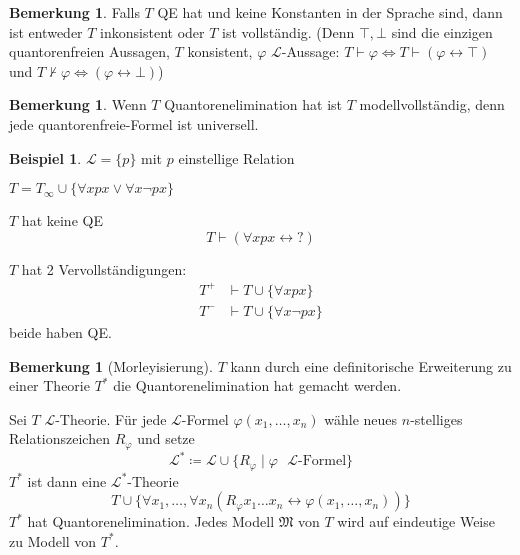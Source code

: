 \documentclass[12pt,parskip=full]{scrartcl}
\theoremstyle{definition}
\newtheorem{example}[theorem]{Beispiel}
\newtheorem{remark}[theorem]{Bemerkung}
\begin{document}
	\begin{remark}
		Falls $T$ QE hat und keine Konstanten in der Sprache sind, dann ist entweder $T$ inkonsistent oder $T$ ist vollständig. (Denn $\top, \bot$ sind die einzigen quantorenfreien Aussagen, $T$ konsistent, $\varphi$ $\mathcal{L}$-Aussage: $T \vdash \varphi \Leftrightarrow T \vdash (\varphi \leftrightarrow \top)$ und $T \not\vdash \varphi \Leftrightarrow (\varphi \leftrightarrow \bot)$)
	\end{remark}

	\begin{remark}
		Wenn $T$ Quantorenelimination hat ist $T$ modellvollständig, denn jede quantorenfreie-Formel ist universell.
	\end{remark}

	\begin{example}
		$\mathcal{L} = \{ p \}$ mit $p$ einstellige Relation
		
		$T = T_\infty \cup \{ \forall x p x \lor \forall x \lnot p x \}$
		
		$T$ hat keine QE
		\begin{equation*}
			T \vdash (\forall x px \leftrightarrow ?)
		\end{equation*}
		
		$T$ hat 2 Vervollständigungen:
		\begin{align*}
			T^+ &\vdash T \cup \{ \forall x p x \} \\
			T^- &\vdash T \cup \{ \forall x \lnot p x \}
		\end{align*}
		beide haben QE.
	\end{example}

	\begin{remark}[Morleyisierung]
		$T$ kann durch eine definitorische Erweiterung zu einer Theorie $T^*$ die Quantorenelimination hat gemacht werden.
		
		Sei $T$ $\mathcal{L}$-Theorie. Für jede $\mathcal{L}$-Formel $\varphi(x_1, \dots, x_n)$ wähle neues $n$-stelliges Relationszeichen $R_\varphi$ und setze
		\begin{equation*}
			\mathcal{L}^* \coloneqq \mathcal{L} \cup \{ R_\varphi \mid \varphi \text{ $\mathcal{L}$-Formel} \}
		\end{equation*}
		$T^*$ ist dann eine $\mathcal{L}^*$-Theorie
		\begin{equation*}
			T \cup \{ \forall x_1, \dots, \forall x_n (R_\varphi x_1 \dots x_n \leftrightarrow \varphi(x_1, \dots, x_n)) \}
		\end{equation*}
		$T^*$ hat Quantorenelimination.
		Jedes Modell $\mathfrak{M}$ von $T$ wird auf eindeutige Weise zu Modell von $T^*$.
	\end{remark}
\end{document}
